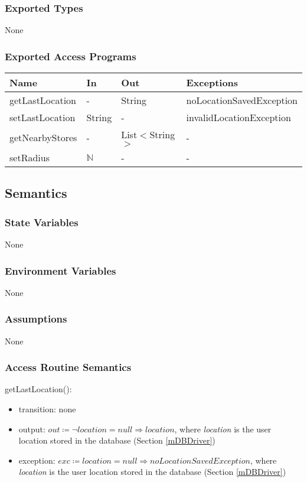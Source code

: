 \documentclass[12pt, titlepage]{article}
\begin{document}
\subsubsection{Exported Types}

None

\subsubsection{Exported Access Programs}

\begin{center}
\begin{tabular}{p{5cm} p{3cm} p{3cm} p{5cm}}
\hline
\textbf{Name} & \textbf{In} & \textbf{Out} & \textbf{Exceptions} \\
\hline
getLastLocation & - & String & noLocationSavedException \\
setLastLocation & String & - & invalidLocationException \\
getNearbyStores & - & List$<$String$>$ & - \\
setRadius & $\mathbb{N}$ & - & - \\
\hline
\end{tabular}
\end{center}

\subsection{Semantics}

\subsubsection{State Variables}
None

\subsubsection{Environment Variables}
None

\subsubsection{Assumptions}
None

\subsubsection{Access Routine Semantics}

\noindent getLastLocation():
\begin{itemize}
\item transition: none
\item output: \( \textit{out} \coloneqq \neg location = null \Rightarrow  location \), where \textit{location} is the user location stored in the database (Section \ref{mDBDriver})
\item exception: \( \textit{exc} \coloneqq location = null \Rightarrow  noLocationSavedException \), where \textit{location} is the user location stored in the database (Section \ref{mDBDriver})
\end{itemize}
\end{document}
